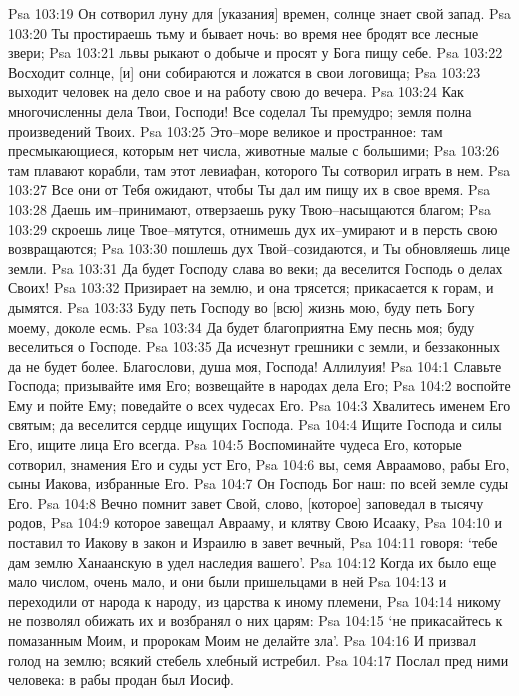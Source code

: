 Psa 103:19  Он сотворил луну для [указания] времен, солнце знает свой запад.
Psa 103:20  Ты простираешь тьму и бывает ночь: во время нее бродят все лесные звери;
Psa 103:21  львы рыкают о добыче и просят у Бога пищу себе.
Psa 103:22  Восходит солнце, [и] они собираются и ложатся в свои логовища;
Psa 103:23  выходит человек на дело свое и на работу свою до вечера.
Psa 103:24  Как многочисленны дела Твои, Господи! Все соделал Ты премудро; земля полна произведений Твоих.
Psa 103:25  Это--море великое и пространное: там пресмыкающиеся, которым нет числа, животные малые с большими;
Psa 103:26  там плавают корабли, там этот левиафан, которого Ты сотворил играть в нем.
Psa 103:27  Все они от Тебя ожидают, чтобы Ты дал им пищу их в свое время.
Psa 103:28  Даешь им--принимают, отверзаешь руку Твою--насыщаются благом;
Psa 103:29  скроешь лице Твое--мятутся, отнимешь дух их--умирают и в персть свою возвращаются;
Psa 103:30  пошлешь дух Твой--созидаются, и Ты обновляешь лице земли.
Psa 103:31  Да будет Господу слава во веки; да веселится Господь о делах Своих!
Psa 103:32  Призирает на землю, и она трясется; прикасается к горам, и дымятся.
Psa 103:33  Буду петь Господу во [всю] жизнь мою, буду петь Богу моему, доколе есмь.
Psa 103:34  Да будет благоприятна Ему песнь моя; буду веселиться о Господе.
Psa 103:35  Да исчезнут грешники с земли, и беззаконных да не будет более. Благослови, душа моя, Господа! Аллилуия!
Psa 104:1  Славьте Господа; призывайте имя Его; возвещайте в народах дела Его;
Psa 104:2  воспойте Ему и пойте Ему; поведайте о всех чудесах Его.
Psa 104:3  Хвалитесь именем Его святым; да веселится сердце ищущих Господа.
Psa 104:4  Ищите Господа и силы Его, ищите лица Его всегда.
Psa 104:5  Воспоминайте чудеса Его, которые сотворил, знамения Его и суды уст Его,
Psa 104:6  вы, семя Авраамово, рабы Его, сыны Иакова, избранные Его.
Psa 104:7  Он Господь Бог наш: по всей земле суды Его.
Psa 104:8  Вечно помнит завет Свой, слово, [которое] заповедал в тысячу родов,
Psa 104:9  которое завещал Аврааму, и клятву Свою Исааку,
Psa 104:10  и поставил то Иакову в закон и Израилю в завет вечный,
Psa 104:11  говоря: `тебе дам землю Ханаанскую в удел наследия вашего'.
Psa 104:12  Когда их было еще мало числом, очень мало, и они были пришельцами в ней
Psa 104:13  и переходили от народа к народу, из царства к иному племени,
Psa 104:14  никому не позволял обижать их и возбранял о них царям:
Psa 104:15  `не прикасайтесь к помазанным Моим, и пророкам Моим не делайте зла'.
Psa 104:16  И призвал голод на землю; всякий стебель хлебный истребил.
Psa 104:17  Послал пред ними человека: в рабы продан был Иосиф.

